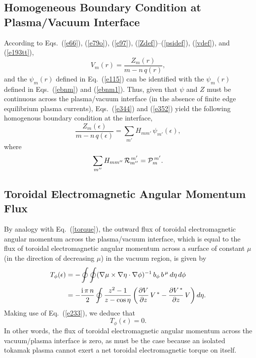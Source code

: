 \documentclass[12pt,prb,aps]{revtex4-1}
\begin{document}
\subsection{Homogeneous Boundary Condition at Plasma/Vacuum Interface}
According to Eqs.~(\ref{e66}), (\ref{e79o}), (\ref{e97}), (\ref{Zdef})--(\ref{psidef}),  (\ref{vdef}), and (\ref{e193tt}), 
\begin{equation}\label{evdef}
V_m(r)= \frac{Z_m(r)}{m-n\,q(r)},
\end{equation}
and the $\psi_m(r)$ defined in Eq.~(\ref{e115}) can be identified with the $\psi_m(r)$ defined in Eqs.~(\ref{ebnm}) and (\ref{ebnm1}). 
Thus, given that $\psi$ and $Z$ must be continuous across the plasma/vacuum interface (in the absence of finite
edge equilibrium plasma currents), Eqs.~(\ref{e344}) and (\ref{e352}) yield the following homogenous boundary condition at the  interface,
\begin{equation}\label{bc}
\frac{Z_m(\epsilon)}{m-n\,q(\epsilon)} = \sum_{m'} H_{mm'}\,\psi_{m'}(\epsilon),
\end{equation}
where
\begin{equation}\label{ehdef}
\sum_{m''}H_{mm''}\,{\cal R}_{m''}^{\,m'} = {\cal P}_m^{\,m'}.
\end{equation}

\subsection{Toroidal Electromagnetic Angular Momentum Flux}
By analogy with Eq.~(\ref{torque}), the outward flux of toroidal electromagnetic angular momentum across the plasma/vacuum interface,
which is equal to the flux of  toroidal electromagnetic angular momentum across a surface of constant $\mu$ (in the direction of
decreasing $\mu$) in the vacuum region, is given by 
\begin{align}
T_\phi(\epsilon) &= -\oint\oint (\nabla\mu\times \nabla\eta\cdot\nabla\phi)^{-1}\,b_\phi\,b^{\,\mu}\,d\eta\,d\phi\nonumber\\[0.5ex]
&= -\frac{{\rm i}\,\pi\,n}{2}\oint \frac{z^2-1}{z-\cos\eta}\left(\frac{\partial V}{\partial z}\,V^{\,\ast}-\frac{\partial V^{\,\ast}}{\partial z}\,V\right)d\eta.
\end{align}
Making use of Eq.~(\ref{e233}), we deduce that 
\begin{equation}\label{e300}
T_\phi(\epsilon)=0.
\end{equation}
In other words, the flux of toroidal  electromagnetic angular momentum across the vacuum/plasma interface is zero, as must be the
case because an isolated tokamak plasma cannot exert a net toroidal electromagnetic torque on itself.\cite{am1}
\end{document}
